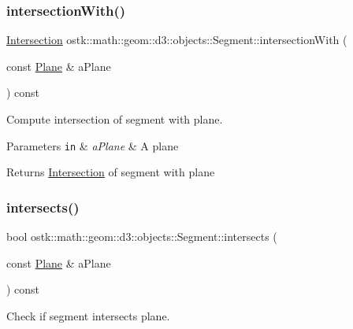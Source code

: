 \subsubsection{\texorpdfstring{intersection\+With()}{intersectionWith()}}
{\footnotesize\ttfamily \hyperlink{classostk_1_1math_1_1geom_1_1d3_1_1_intersection}{Intersection} ostk\+::math\+::geom\+::d3\+::objects\+::\+Segment\+::intersection\+With (\begin{DoxyParamCaption}\item[{const \hyperlink{classostk_1_1math_1_1geom_1_1d3_1_1objects_1_1_plane}{Plane} \&}]{a\+Plane }\end{DoxyParamCaption}) const}



Compute intersection of segment with plane. 


\begin{DoxyParams}[1]{Parameters}
\mbox{\tt in}  & {\em a\+Plane} & A plane \\
\hline
\end{DoxyParams}
\begin{DoxyReturn}{Returns}
\hyperlink{classostk_1_1math_1_1geom_1_1d3_1_1_intersection}{Intersection} of segment with plane 
\end{DoxyReturn}
\mbox{\label{classostk_1_1math_1_1geom_1_1d3_1_1objects_1_1_segment_a0d26133252b257cf0d9553ac418200c5}} 
\subsubsection{\texorpdfstring{intersects()}{intersects()}\hspace{0.1cm}{\footnotesize\ttfamily [1/3]}}
{\footnotesize\ttfamily bool ostk\+::math\+::geom\+::d3\+::objects\+::\+Segment\+::intersects (\begin{DoxyParamCaption}\item[{const \hyperlink{classostk_1_1math_1_1geom_1_1d3_1_1objects_1_1_plane}{Plane} \&}]{a\+Plane }\end{DoxyParamCaption}) const}



Check if segment intersects plane. 


